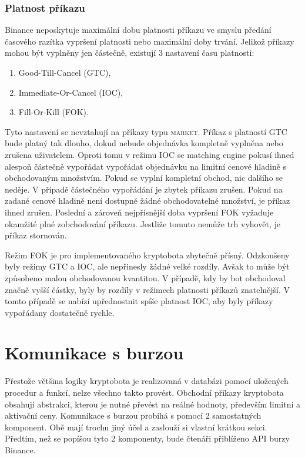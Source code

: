 \subsubsection{Platnost příkazu}
Binance neposkytuje maximální dobu platnosti příkazu ve smyslu předání časového razítka vypršení platnosti nebo maximální doby trvání. Jelikož příkazy mohou být vyplněny jen částečně, existují
3 nastavení času platnosti:
\begin{enumerate}
    \item Good-Till-Cancel (GTC),
    \item Immediate-Or-Cancel (IOC),
    \item Fill-Or-Kill (FOK).
\end{enumerate}
Tyto nastavení se nevztahují na příkazy typu \textsc{market}. Příkaz s platností GTC bude platný tak dlouho, dokud nebude objednávka kompletně vyplněna nebo zrušena uživatelem. Oproti tomu v
režimu IOC se matching engine pokusí ihned alespoň částečně vypořádat vypořádat objednávku na limitní cenové hladině s obchodovaným množstvím. Pokud se vyplní kompletní obchod, nic dalšího 
se neděje. V případě částečného vypořádání je zbytek příkazu zrušen. Pokud na zadané cenové hladině není dostupné žádné obchodovatelné množství, je příkaz ihned zrušen.
Poslední a zároveň nejpřísnější doba vypršení FOK vyžaduje okamžité plné zobchodování příkazu. Jestliže tomuto nemůže trh vyhovět, je příkaz stornován.

Režim FOK je pro implementovaného kryptobota zbytečně přísný. Odzkoušeny byly režimy GTC a IOC, ale nepřinesly žádné velké rozdíly. Avšak to může být způsobeno malou obchodovanou kvantitou.
V případě, kdy by bot obchodoval značně vyšší částky, byly by rozdíly v režimech platnosti příkazů znatelnější. V tomto případě se nabízí upřednostnit spíše platnost IOC, aby byly příkazy
vypořádany dostatečně rychle. 

\section{Komunikace s burzou}
\label{subsec:exchanges-comm}
Přestože většina logiky kryptobota je realizovaná v databázi pomocí uložených procedur a funkcí, nelze všechno takto provést. Obchodní příkazy kryptobota obsahují abstrakci, kterou je
nutné převést na reálné hodnoty, především limitní a aktivační ceny. Komunikace s burzou probíhá s pomocí 2 samostatných komponent. Obě mají trochu jiný účel a zaslouží si vlastní krátkou sekci.
Předtím, než se popíšou tyto 2 komponenty, bude čtenáři přiblíženo API burzy Binance.

